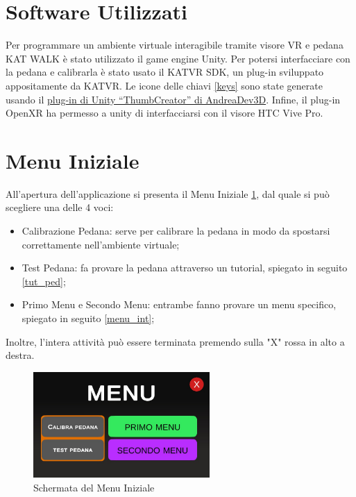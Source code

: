 \documentclass[target=bach,aauheader=]{thud}
\begin{document}
\section{Software Utilizzati}
Per programmare un ambiente virtuale interagibile tramite visore VR e pedana KAT WALK è stato utilizzato il game engine Unity.
Per potersi interfacciare con la pedana e calibrarla è stato usato il KATVR SDK, un plug-in sviluppato appositamente da KATVR.
Le icone delle chiavi \ref{keys} sono state generate usando il \href{https://github.com/AndreaDev3D/ThumbCreator}{plug-in di Unity “ThumbCreator” di AndreaDev3D}.
Infine, il plug-in OpenXR ha permesso a unity di interfacciarsi con il visore HTC Vive Pro.

\section{Menu Iniziale}
\label{menu_init}
All'apertura dell'applicazione si presenta il Menu Iniziale \ref{fig:menu_screen}, dal quale si può scegliere una delle 4 voci:
\begin{itemize}
    \item Calibrazione Pedana: serve per calibrare la pedana in modo da spostarsi correttamente nell'ambiente virtuale;
    \item Test Pedana: fa provare la pedana attraverso un tutorial, spiegato in seguito \ref{tut_ped};
    \item Primo Menu e Secondo Menu: entrambe fanno provare un menu specifico, spiegato in seguito \ref{menu_int};
\end{itemize} 
Inoltre, l'intera attività può essere terminata premendo sulla "X" rossa in alto a destra.

\begin{figure}[h]
    \centering
    \includegraphics[width=0.60\textwidth]{menu_screen}
    \caption{Schermata del Menu Iniziale}
    \label{fig:menu_screen}
\end{figure}
\end{document}
